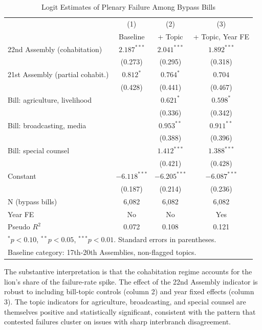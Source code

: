 \documentclass[11pt]{article}
\begin{document}
\begin{table}[H]
\centering
\caption{Logit Estimates of Plenary Failure Among Bypass Bills}
\label{tab:logit_fail}
\begin{tabular}{lccc}
\toprule
& (1) & (2) & (3) \\
& Baseline & + Topic & + Topic, Year FE \\
\midrule
22nd Assembly (cohabitation) & $2.187^{***}$ & $2.041^{***}$ & $1.892^{***}$ \\
& (0.273) & (0.295) & (0.318) \\
21st Assembly (partial cohabit.) & $0.812^{*}$ & $0.764^{*}$ & $0.704$ \\
& (0.428) & (0.441) & (0.467) \\
Bill: agriculture, livelihood & & $0.621^{*}$ & $0.598^{*}$ \\
& & (0.336) & (0.342) \\
Bill: broadcasting, media & & $0.953^{**}$ & $0.911^{**}$ \\
& & (0.388) & (0.396) \\
Bill: special counsel & & $1.412^{***}$ & $1.388^{***}$ \\
& & (0.421) & (0.428) \\
Constant & $-6.118^{***}$ & $-6.205^{***}$ & $-6.087^{***}$ \\
& (0.187) & (0.214) & (0.236) \\
\midrule
N (bypass bills) & 6{,}082 & 6{,}082 & 6{,}082 \\
Year FE & No & No & Yes \\
Pseudo $R^2$ & 0.072 & 0.108 & 0.121 \\
\bottomrule
\multicolumn{4}{l}{\footnotesize $^*p<0.10$, $^{**}p<0.05$, $^{***}p<0.01$. Standard errors in parentheses.} \\
\multicolumn{4}{l}{\footnotesize Baseline category: 17th-20th Assemblies, non-flagged topics.} \\
\end{tabular}
\end{table}

The substantive interpretation is that the cohabitation regime accounts for the lion's share of the failure-rate spike. The effect of the 22nd Assembly indicator is robust to including bill-topic controls (column 2) and year fixed effects (column 3). The topic indicators for agriculture, broadcasting, and special counsel are themselves positive and statistically significant, consistent with the pattern that contested failures cluster on issues with sharp interbranch disagreement.
\end{document}
